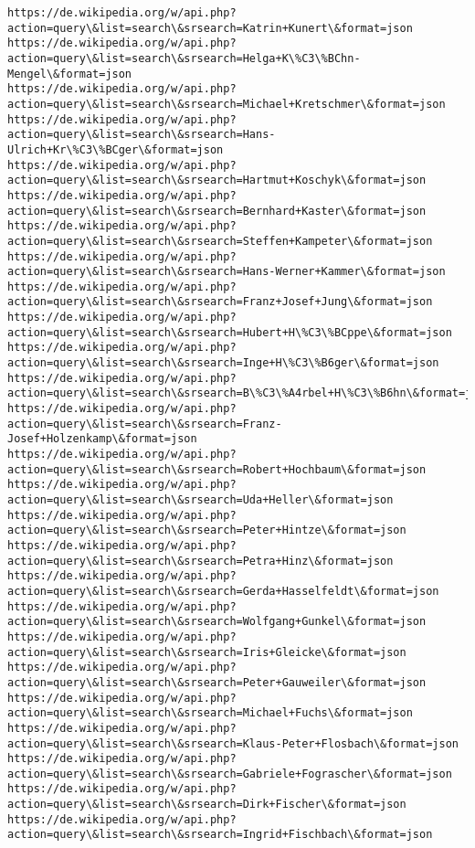 \documentclass[11pt]{article}
\begin{document}
\begin{Verbatim}[commandchars=\\\{\}]
https://de.wikipedia.org/w/api.php?action=query\&list=search\&srsearch=Katrin+Kunert\&format=json
https://de.wikipedia.org/w/api.php?action=query\&list=search\&srsearch=Helga+K\%C3\%BChn-Mengel\&format=json
https://de.wikipedia.org/w/api.php?action=query\&list=search\&srsearch=Michael+Kretschmer\&format=json
https://de.wikipedia.org/w/api.php?action=query\&list=search\&srsearch=Hans-Ulrich+Kr\%C3\%BCger\&format=json
https://de.wikipedia.org/w/api.php?action=query\&list=search\&srsearch=Hartmut+Koschyk\&format=json
https://de.wikipedia.org/w/api.php?action=query\&list=search\&srsearch=Bernhard+Kaster\&format=json
https://de.wikipedia.org/w/api.php?action=query\&list=search\&srsearch=Steffen+Kampeter\&format=json
https://de.wikipedia.org/w/api.php?action=query\&list=search\&srsearch=Hans-Werner+Kammer\&format=json
https://de.wikipedia.org/w/api.php?action=query\&list=search\&srsearch=Franz+Josef+Jung\&format=json
https://de.wikipedia.org/w/api.php?action=query\&list=search\&srsearch=Hubert+H\%C3\%BCppe\&format=json
https://de.wikipedia.org/w/api.php?action=query\&list=search\&srsearch=Inge+H\%C3\%B6ger\&format=json
https://de.wikipedia.org/w/api.php?action=query\&list=search\&srsearch=B\%C3\%A4rbel+H\%C3\%B6hn\&format=json
https://de.wikipedia.org/w/api.php?action=query\&list=search\&srsearch=Franz-Josef+Holzenkamp\&format=json
https://de.wikipedia.org/w/api.php?action=query\&list=search\&srsearch=Robert+Hochbaum\&format=json
https://de.wikipedia.org/w/api.php?action=query\&list=search\&srsearch=Uda+Heller\&format=json
https://de.wikipedia.org/w/api.php?action=query\&list=search\&srsearch=Peter+Hintze\&format=json
https://de.wikipedia.org/w/api.php?action=query\&list=search\&srsearch=Petra+Hinz\&format=json
https://de.wikipedia.org/w/api.php?action=query\&list=search\&srsearch=Gerda+Hasselfeldt\&format=json
https://de.wikipedia.org/w/api.php?action=query\&list=search\&srsearch=Wolfgang+Gunkel\&format=json
https://de.wikipedia.org/w/api.php?action=query\&list=search\&srsearch=Iris+Gleicke\&format=json
https://de.wikipedia.org/w/api.php?action=query\&list=search\&srsearch=Peter+Gauweiler\&format=json
https://de.wikipedia.org/w/api.php?action=query\&list=search\&srsearch=Michael+Fuchs\&format=json
https://de.wikipedia.org/w/api.php?action=query\&list=search\&srsearch=Klaus-Peter+Flosbach\&format=json
https://de.wikipedia.org/w/api.php?action=query\&list=search\&srsearch=Gabriele+Fograscher\&format=json
https://de.wikipedia.org/w/api.php?action=query\&list=search\&srsearch=Dirk+Fischer\&format=json
https://de.wikipedia.org/w/api.php?action=query\&list=search\&srsearch=Ingrid+Fischbach\&format=json

\end{Verbatim}
\end{document}
